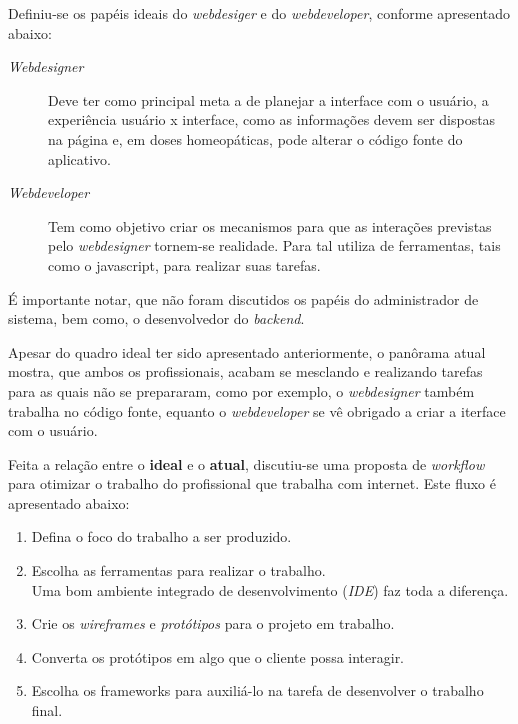 \documentclass[a4paper]{report}
\begin{document}
        Definiu-se os pap\'{e}is ideais do \emph{webdesiger} e do
        \emph{webdeveloper}, conforme apresentado abaixo:

        \begin{description}

            \item[\emph{Webdesigner}] Deve ter como principal meta a de planejar
            a interface com o usu\'{a}rio, a experi\^{e}ncia usu\'{a}rio x
            interface, como as informa\c{c}\~{o}es devem ser dispostas na
            p\'{a}gina e, em doses homeop\'{a}ticas, pode alterar o c\'{o}digo
            fonte do aplicativo.

            \item[\emph{Webdeveloper}] Tem como objetivo criar os mecanismos para
            que as intera\c{c}\~{o}es previstas pelo \emph{webdesigner} tornem-se
            realidade. Para tal utiliza de ferramentas, tais como o javascript,
            para realizar suas tarefas.

        \end{description}

        \'{E} importante notar, que n\~{a}o foram discutidos os pap\'{e}is do
        administrador de sistema, bem como, o desenvolvedor do \emph{backend}.

        Apesar do quadro ideal ter sido apresentado anteriormente, o pan\^{o}rama
        atual mostra, que ambos os profissionais, acabam se mesclando e
        realizando tarefas para as quais n\~{a}o se prepararam, como por exemplo,
        o \emph{webdesigner} tamb\'{e}m trabalha no c\'{o}digo fonte, equanto o
        \emph{webdeveloper} se v\^{e} obrigado a criar a iterface com o
        usu\'{a}rio.

        Feita a rela\c{c}\~{a}o entre o \textbf{ideal} e o \textbf{atual},
        discutiu-se uma proposta de \emph{workflow} para otimizar o trabalho do
        profissional que trabalha com internet. Este fluxo \'{e} apresentado
        abaixo:

        \begin{enumerate}

            \item Defina o foco do trabalho a ser produzido.

            \item Escolha as ferramentas para realizar o trabalho.
                \\Uma bom ambiente integrado de desenvolvimento (\emph{IDE})
                faz toda a diferen\c{c}a.

            \item Crie os \emph{wireframes} e \emph{prot\'{o}tipos} para o
            projeto em trabalho.

            \item Converta os prot\'{o}tipos em algo que o cliente possa
            interagir.

            \item Escolha os frameworks para auxili\'{a}-lo na tarefa de
            desenvolver o trabalho final.

        \end{enumerate}
\end{document}
